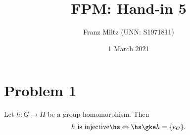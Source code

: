 \documentclass{article}
\begin{document}
\title{FPM: Hand-in 5}
\author{Franz Miltz (UNN: S1971811)}
\date{1 March 2021}
\maketitle
\mkthms

\section*{Problem 1}

\begin{claim*}
    Let $h:G\to H$ be a group homomorphism. Then
    \begin{align}
        \label{iff}
        h\text{ is injective}\hs\Leftrightarrow\hs \gke h = \{e_G\}.
    \end{align}
\end{claim*}
\end{document}
